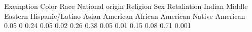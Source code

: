 Exemption Color Race National origin Religion Sex Retaliation Indian Middle Eastern Hispanic/Latino Asian American African American Native American 0.05 0 0.24 0.05 0.02 0.26 0.38 0.05 0.01 0.15 0.08 0.71 0.001